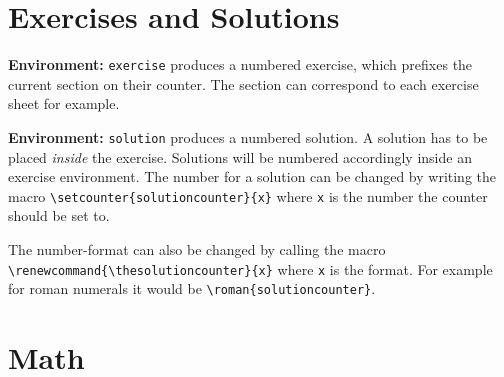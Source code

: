\documentclass[a4paper,10pt,oneside]{scrartcl}
\newcommand{\environmentcmd}[1]{\par\noindent\textbf{Environment:} \lstinline^#1^}
\begin{document}
\newpage
\section{Exercises and Solutions}
\environmentcmd{exercise} produces a numbered exercise, which prefixes the current section on their counter. The section can correspond to each exercise sheet for example.

\environmentcmd{solution} produces a numbered solution. A solution has to be placed \emph{inside} the exercise. Solutions will be numbered accordingly inside an exercise environment. The number for a solution can be changed by writing the macro \lstinline^\setcounter{solutioncounter}{x}^ where \lstinline^x^ is the number the counter should be set to.

The number-format can also be changed by calling the macro \lstinline^\renewcommand{\thesolutioncounter}{x}^ where \lstinline^x^ is the format. For example for roman numerals it would be \lstinline^\roman{solutioncounter}^.

\begin{exercise}%
  \lipsum[1-1]
  \begin{solution}%
    \lipsum[1-1]
  \end{solution}
  \begin{solution}%
    \lipsum[1-1]
  \end{solution}
  \begin{solution}%
    \lipsum[1-1]
  \end{solution}
\end{exercise}

\begin{exercise}[title=Übung]%
  \lipsum[1-1]
  \begin{solution}%
    \lipsum[1-1]
  \end{solution}
\end{exercise}

\begin{exercise}%
  \renewcommand{\thesolutioncounter}{(\roman{solutioncounter})}%
  \lipsum[1-1]
  \begin{solution}%
  \end{solution}
  \begin{solution}%
  \end{solution}
\end{exercise}

\section{Math}
\end{document}
